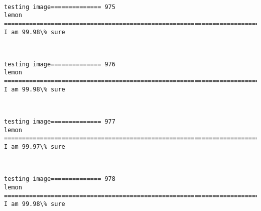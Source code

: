 \documentclass[11pt]{article}
\begin{document}
    \begin{center}
    \end{center}
    { \hspace*{\fill} \\}
    
    \begin{Verbatim}[commandchars=\\\{\}]
testing image============== 975
lemon
============================================================================
I am 99.98\% sure

    \end{Verbatim}

    \begin{center}
    \end{center}
    { \hspace*{\fill} \\}
    
    \begin{Verbatim}[commandchars=\\\{\}]
testing image============== 976
lemon
============================================================================
I am 99.98\% sure

    \end{Verbatim}

    \begin{center}
    \end{center}
    { \hspace*{\fill} \\}
    
    \begin{Verbatim}[commandchars=\\\{\}]
testing image============== 977
lemon
============================================================================
I am 99.97\% sure

    \end{Verbatim}

    \begin{center}
    \end{center}
    { \hspace*{\fill} \\}
    
    \begin{Verbatim}[commandchars=\\\{\}]
testing image============== 978
lemon
============================================================================
I am 99.98\% sure

    \end{Verbatim}
\end{document}
